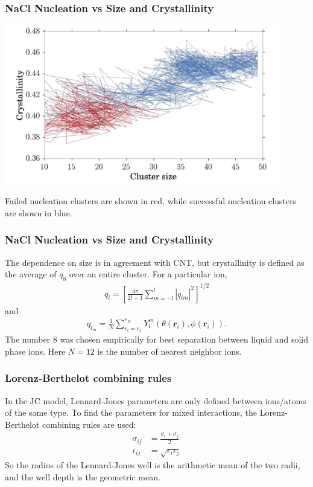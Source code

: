 \documentclass{beamer}
\newenvironment{noheadline}{
	\setbeamertemplate{headline}{}
	\addtobeamertemplate{frametitle}{\vspace*{-0.9\baselineskip}}{}
}{}
\newcommand{\insertcurrentcitation}{}
\newcommand{\currentcitation}[1]{
	\renewcommand{\insertcurrentcitation}{#1}
} %
\begin{document}
\begin{noheadline}
\currentcitation{\cite{Lanaro2016}}
\begin{frame}
\frametitle{NaCl Nucleation vs Size and Crystallinity}
\begin{center}
	\includegraphics[trim={0cm 0cm 0cm 0cm},clip,width=0.9\textwidth]{figures/Crystallinity.png}
\end{center}
Failed nucleation clusters are shown in red, while successful nucleation clusters are shown in blue.
\end{frame}

\begin{frame}
\frametitle{NaCl Nucleation vs Size and Crystallinity}
The dependence on size is in agreement with CNT, but crystallinity is defined as the average of $q_{8}$ over an entire cluster. For a particular ion,
\begin{align*}
q _ { l } = \left[ \frac { 4 \pi } { 2 l + 1 } \sum _ { m = - l } ^ { l } \left| q _ { l m } \right| ^ { 2 } \right] ^ { 1 / 2 }
\end{align*}
and
\begin{align*}
q _ { l _ { m } } = \frac { 1 } { N } \sum _ { r _ { i } = r _ { 1 } } ^ { r _ { N } } Y _ { l } ^ { m } \left( \theta \left( \mathbf { r } _ { i } \right) , \phi \left( \mathbf { r } _ { i } \right) \right).
\end{align*}
The number 8 was chosen empirically for best separation between liquid and solid phase ions. Here $N=12$ is the number of nearest neighbor ions.
\end{frame}

\currentcitation{}
\begin{frame}
\frametitle{Lorenz-Berthelot combining rules}
In the JC model, Lennard-Jones parameters are only defined between ions/atoms of the same type. To find the parameters for mixed interactions, the Lorenz-Berthelot combining rules are used:
\begin{align*}
\sigma_{ij} &= \frac{\sigma_{i} + \sigma_{j}}{2}\\
\epsilon_{ij} &= \sqrt{\epsilon_{i} \epsilon_{j}}
\end{align*}
So the radius of the Lennard-Jones well is the arithmetic mean of the two radii, and the well depth is the geometric mean.
\end{frame}


\end{noheadline}
\end{document}
